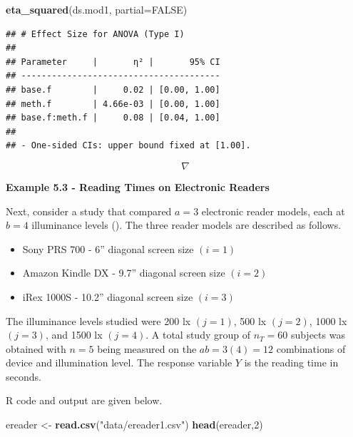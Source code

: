 \documentclass[
]{book}
\newenvironment{Shaded}{\begin{snugshade}}{\end{snugshade}}
\newcommand{\AttributeTok}[1]{\textcolor[rgb]{0.13,0.29,0.53}{#1}}
\newcommand{\ConstantTok}[1]{\textcolor[rgb]{0.56,0.35,0.01}{#1}}
\newcommand{\DecValTok}[1]{\textcolor[rgb]{0.00,0.00,0.81}{#1}}
\newcommand{\FunctionTok}[1]{\textcolor[rgb]{0.13,0.29,0.53}{\textbf{#1}}}
\newcommand{\NormalTok}[1]{#1}
\newcommand{\OtherTok}[1]{\textcolor[rgb]{0.56,0.35,0.01}{#1}}
\newcommand{\StringTok}[1]{\textcolor[rgb]{0.31,0.60,0.02}{#1}}
\providecommand{\tightlist}{%
  \setlength{\itemsep}{0pt}\setlength{\parskip}{0pt}}
\begin{document}
\begin{Shaded}
\begin{Highlighting}[]
\FunctionTok{eta\_squared}\NormalTok{(ds.mod1, }\AttributeTok{partial=}\ConstantTok{FALSE}\NormalTok{)}
\end{Highlighting}
\end{Shaded}

\begin{verbatim}
## # Effect Size for ANOVA (Type I)
## 
## Parameter     |       η² |       95% CI
## ---------------------------------------
## base.f        |     0.02 | [0.00, 1.00]
## meth.f        | 4.66e-03 | [0.00, 1.00]
## base.f:meth.f |     0.08 | [0.04, 1.00]
## 
## - One-sided CIs: upper bound fixed at [1.00].
\end{verbatim}

\[ \nabla \]

\textbf{Example 5.3 - Reading Times on Electronic Readers}

Next, consider a study that compared \(a=3\) electronic reader models,
each at \(b=4\) illuminance levels (). The three reader models are described as
follows.

\begin{itemize}
\tightlist
\item
  Sony PRS 700 - 6'' diagonal screen size \((i=1)\)
\item
  Amazon Kindle DX - 9.7'' diagonal screen size \((i=2)\)
\item
  iRex 1000S - 10.2'' diagonal screen size \((i=3)\)
\end{itemize}

The illuminance levels studied were 200 lx \((j=1)\), 500 lx \((j=2)\),
1000 lx \((j=3)\), and 1500 lx \((j=4)\). A total study group of
\(n_T=60\) subjects was obtained with \(n=5\) being measured on the
\(ab=3(4)=12\) combinations of device and illumination level. The
response variable \(Y\) is the reading time in seconds.

R code and output are given below.

\begin{Shaded}
\begin{Highlighting}[]
\NormalTok{ereader }\OtherTok{\textless{}{-}} \FunctionTok{read.csv}\NormalTok{(}\StringTok{"data/ereader1.csv"}\NormalTok{)}
\FunctionTok{head}\NormalTok{(ereader,}\DecValTok{2}\NormalTok{)}
\end{Highlighting}
\end{Shaded}
\end{document}
